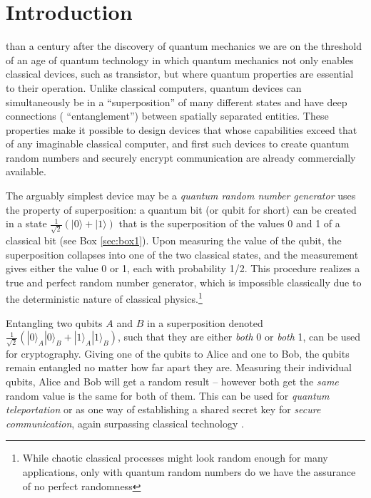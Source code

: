 \documentclass[journal]{IEEEtran}
\begin{document}
\section{Introduction}

 than a century after the discovery of quantum mechanics we are on the threshold of an age of quantum technology in which quantum mechanics not only enables classical devices,  such as transistor, but where quantum properties are essential to their operation. Unlike classical computers, quantum devices can simultaneously be in a ``superposition'' of many different states and have deep connections ( ``entanglement'') between spatially separated entities.  These properties make it possible to design devices that whose capabilities exceed that of any imaginable classical computer, and first such devices to create quantum random numbers and securely encrypt communication are already commercially available. 

The arguably simplest device may be a {\em quantum random number generator} uses the property of superposition:  a quantum bit (or qubit for short) can be created in a state $\frac{1}{\sqrt{2}}(|0\rangle + |1\rangle)$ that is the superposition  of the values 0 and 1 of a classical bit (see Box \ref{sec:box1}). Upon measuring the value of the qubit, the superposition collapses into one of the two classical states, and the measurement gives either the value 0 or 1, each with probability 1/2. This procedure realizes a true and perfect random number generator, which is impossible classically due to the deterministic nature of classical physics.\footnote{While  chaotic classical processes might look random enough for many applications, only with quantum random numbers do we have the assurance of no perfect randomness}

Entangling two qubits $A$ and $B$ in a superposition denoted $\frac{1}{\sqrt{2}}(|0\rangle_A|0\rangle_B + |1\rangle_A|1\rangle_B)$, such that they are either {\em both} 0 or {\em both} 1, can be used for cryptography. Giving one of the qubits to Alice and one to Bob, the qubits remain entangled no matter how far apart they are. Measuring their individual qubits, Alice and Bob will get a random result -- however both get the {\em same} random value is the same for both of them. This can be used for {\em quantum teleportation} or as one way of establishing a shared secret key for  {\em secure  communication}, again surpassing classical technology \cite{RevModPhys.81.1301,EkertRenner2014}. 
\end{document}

